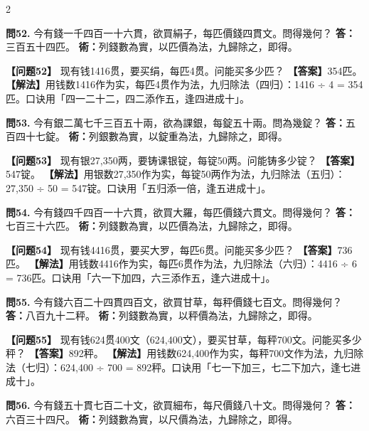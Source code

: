 \documentclass[11pt,a4paper]{article}
\begin{document}
\begin{paracol}{2}
\switchcolumn*

\textbf{問52.} 今有錢一千四百一十六貫，欲買絹子，每匹價錢四貫文。問得幾何？\break
\textbf{答：}三百五十四匹。\break
\textbf{術：}列錢數為實，以匹價為法，九歸除之，即得。

\switchcolumn

\textbf{【问题52】} 现有钱1416贯，要买绢，每匹4贯。问能买多少匹？\break
\textbf{【答案】}354匹。\break
\textbf{【解法】}用钱数1416作为实，每匹4贯作为法，九归除法（四归）：1416 ÷ 4 = 354匹。口诀用「四一二十二，四二添作五，逢四进成十」。

\switchcolumn*

\textbf{問53.} 今有銀二萬七千三百五十兩，欲為課銀，每錠五十兩。問為幾錠？\break
\textbf{答：}五百四十七錠。\break
\textbf{術：}列銀數為實，以錠重為法，九歸除之，即得。

\switchcolumn

\textbf{【问题53】} 现有银27,350两，要铸课银锭，每锭50两。问能铸多少锭？\break
\textbf{【答案】}547锭。\break
\textbf{【解法】}用银数27,350作为实，每锭50两作为法，九归除法（五归）：27,350 ÷ 50 = 547锭。口诀用「五归添一倍，逢五进成十」。

\switchcolumn*

\textbf{問54.} 今有錢四千四百一十六貫，欲買大羅，每匹價錢六貫文。問得幾何？\break
\textbf{答：}七百三十六匹。\break
\textbf{術：}列錢數為實，以匹價為法，九歸除之，即得。

\switchcolumn

\textbf{【问题54】} 现有钱4416贯，要买大罗，每匹6贯。问能买多少匹？\break
\textbf{【答案】}736匹。\break
\textbf{【解法】}用钱数4416作为实，每匹6贯作为法，九归除法（六归）：4416 ÷ 6 = 736匹。口诀用「六一下加四，六三添作五，逢六进成十」。

\switchcolumn*

\textbf{問55.} 今有錢六百二十四貫四百文，欲買甘草，每秤價錢七百文。問得幾何？\break
\textbf{答：}八百九十二秤。\break
\textbf{術：}列錢數為實，以秤價為法，九歸除之，即得。

\switchcolumn

\textbf{【问题55】} 现有钱624贯400文（624,400文），要买甘草，每秤700文。问能买多少秤？\break
\textbf{【答案】}892秤。\break
\textbf{【解法】}用钱数624,400作为实，每秤700文作为法，九归除法（七归）：624,400 ÷ 700 = 892秤。口诀用「七一下加三，七二下加六，逢七进成十」。

\switchcolumn*

\textbf{問56.} 今有錢五十貫七百二十文，欲買細布，每尺價錢八十文。問得幾何？\break
\textbf{答：}六百三十四尺。\break
\textbf{術：}列錢數為實，以尺價為法，九歸除之，即得。


\end{paracol}
\end{document}
